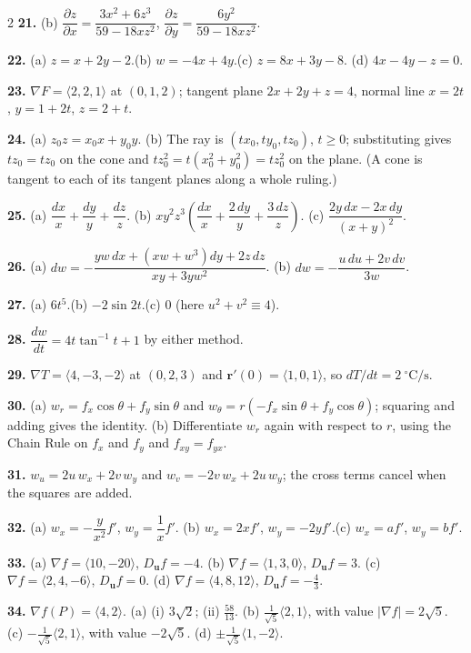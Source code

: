 \documentclass[11pt,oneside]{article}
\newcommand{\br}{\mathbf{r}}
\newcommand{\bu}{\mathbf{u}}
\newcommand{\grad}{\nabla}
\newcommand{\pd}[2]{\dfrac{\partial #1}{\partial #2}}
\newcommand{\dd}[2]{\dfrac{d#1}{d#2}}
\begin{document}
{\begin{multicols}{2}
\textbf{21.} (b) $\pd{z}{x}=\dfrac{3x^{2}+6z^{3}}{59-18xz^{2}}$,\quad
$\pd{z}{y}=\dfrac{6y^{2}}{59-18xz^{2}}$.

\textbf{22.} (a) $z=x+2y-2$.\quad (b) $w=-4x+4y$.\quad (c) $z=8x+3y-8$.\quad
(d) $4x-4y-z=0$.

\textbf{23.} $\grad F=\langle2,2,1\rangle$ at $(0,1,2)$; tangent plane $2x+2y+z=4$, normal line
$x=2t$, $y=1+2t$, $z=2+t$.

\textbf{24.} (a) $z_{0}z=x_{0}x+y_{0}y$.\quad
(b) The ray is $(tx_{0},ty_{0},tz_{0})$, $t\ge0$; substituting gives $t z_{0}=t z_{0}$ on the
cone and $t z_{0}^{2}=t\!\left(x_{0}^{2}+y_{0}^{2}\right)=tz_{0}^{2}$ on the plane. (A cone is
tangent to each of its tangent planes along a whole ruling.)

\textbf{25.} (a) $\dfrac{dx}{x}+\dfrac{dy}{y}+\dfrac{dz}{z}$.\quad
(b) $xy^{2}z^{3}\!\left(\dfrac{dx}{x}+\dfrac{2\,dy}{y}+\dfrac{3\,dz}{z}\right)$.\quad
(c) $\dfrac{2y\,dx-2x\,dy}{(x+y)^{2}}$.

\textbf{26.} (a) $dw=-\dfrac{yw\,dx+\left(xw+w^{3}\right)dy+2z\,dz}{xy+3yw^{2}}$.\quad
(b) $dw=-\dfrac{u\,du+2v\,dv}{3w}$.

\textbf{27.} (a) $6t^{5}$.\quad (b) $-2\sin2t$.\quad (c) $0$ (here $u^{2}+v^{2}\equiv4$).

\textbf{28.} $\dd{w}{t}=4t\tan^{-1}t+1$ by either method.

\textbf{29.} $\grad T=\langle4,-3,-2\rangle$ at $(0,2,3)$ and
$\br'(0)=\langle1,0,1\rangle$, so $dT/dt=2\ {}^{\circ}\text{C/s}$.

\textbf{30.} (a) $w_r=f_x\cos\theta+f_y\sin\theta$ and
$w_\theta=r\left(-f_x\sin\theta+f_y\cos\theta\right)$; squaring and adding gives the identity.\quad
(b) Differentiate $w_r$ again with respect to $r$, using the Chain Rule on $f_x$ and $f_y$ and
$f_{xy}=f_{yx}$.

\textbf{31.} $w_u=2u\,w_x+2v\,w_y$ and $w_v=-2v\,w_x+2u\,w_y$; the cross terms cancel when
the squares are added.

\textbf{32.} (a) $w_x=-\dfrac{y}{x^{2}}f'$, $w_y=\dfrac1x f'$.\quad
(b) $w_x=2xf'$, $w_y=-2yf'$.\quad (c) $w_x=af'$, $w_y=bf'$.

\textbf{33.} (a) $\grad f=\langle10,-20\rangle$, $D_{\bu}f=-4$.\quad
(b) $\grad f=\langle1,3,0\rangle$, $D_{\bu}f=3$.\quad
(c) $\grad f=\langle2,4,-6\rangle$, $D_{\bu}f=0$.\quad
(d) $\grad f=\langle4,8,12\rangle$, $D_{\bu}f=-\tfrac43$.

\textbf{34.} $\grad f(P)=\langle4,2\rangle$.
(a) (i) $3\sqrt{2}$; (ii) $\tfrac{58}{13}$.\quad
(b) $\tfrac{1}{\sqrt5}\langle2,1\rangle$, with value $|\grad f|=2\sqrt5$.\quad
(c) $-\tfrac{1}{\sqrt5}\langle2,1\rangle$, with value $-2\sqrt5$.\quad
(d) $\pm\tfrac{1}{\sqrt5}\langle1,-2\rangle$.


\end{multicols}}
\end{document}
